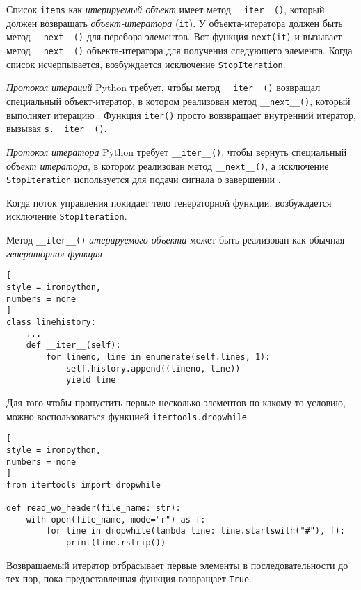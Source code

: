 \documentclass[%
	11pt,
	a4paper,
	utf8,
		]{article}
\begin{document}
Список \texttt{items} как \emph{итерируемый объект} имеет метод \verb|__iter__()|, который должен возвращать \emph{объект-итератора} (\texttt{it}). У объекта-итератора должен быть метод \verb|__next__()| для перебора элементов. Вот функция \texttt{next(it)} и вызывает метод \verb|__next__()| объекта-итератора для получения следующего элемента. Когда список исчерпывается, возбуждается исключение \texttt{StopIteration}.

\emph{Протокол итераций} Python требует, чтобы метод \verb|__iter__()| возвращал специальный объект-итератор, в котором реализован метод \verb|__next__()|, который выполняет итерацию \cite[]{beazley:python_cookbook-2019}. Функция \texttt{iter()} просто вовзвращает внутренний итератор, вызывая \verb|s.__iter__()|.

\emph{Протокол итератора} Python требует \verb|__iter__()|, чтобы вернуть специальный \emph{объект итератора}, в котором реализован метод \verb|__next__()|, а исключение \texttt{StopIteration} используется для подачи сигнала о завершении \cite[]{beazley:python_cookbook-2019}.

Когда поток управления покидает тело генераторной функции, возбуждается исключение \texttt{StopIteration}.

Метод \verb|__iter__()| \emph{итерируемого объекта} может быть реализован как обычная \emph{генераторная функция} \cite[]{beazley:python_cookbook-2019}
\begin{lstlisting}[
style = ironpython,
numbers = none
]
class linehistory:
    ...
    def __iter__(self):
        for lineno, line in enumerate(self.lines, 1):
            self.history.append((lineno, line))
            yield line
\end{lstlisting}

Для того чтобы пропустить первые несколько элементов по какому-то условию, можно воспользоваться функцией \texttt{itertools.dropwhile}
\begin{lstlisting}[
style = ironpython,
numbers = none
]
from itertools import dropwhile

def read_wo_header(file_name: str):
    with open(file_name, mode="r") as f:
        for line in dropwhile(lambda line: line.startswith("#"), f):
            print(line.rstrip())
\end{lstlisting}

Возвращаемый итератор отбрасывает первые элементы в последовательности до тех пор, пока предоставленная функция возвращает \texttt{True}.
\end{document}
